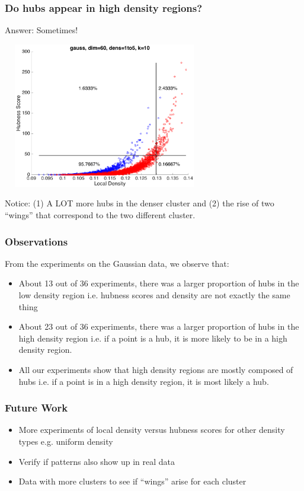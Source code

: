 \documentclass{beamer}
\begin{document}
\begin{frame}
\frametitle{Do hubs appear in high density regions?}

{\small Answer: Sometimes!}

\smallskip

\centering
\includegraphics[width=3.5in,height=2.5in]{./fig/gauss-dim60-1000to5000-k10-DensHub.png}

\smallskip

{\small Notice: (1) A LOT more hubs in the denser cluster and (2) the rise of two ``wings'' that correspond to the two different cluster.}
\end{frame}

\begin{frame}
\frametitle{Observations}

From the experiments on the Gaussian data, we observe that:

\begin{itemize}
\item About 13 out of 36 experiments, there was a larger proportion of hubs in the low density region i.e. hubness scores and density are not exactly the same thing
\item About 23 out of 36 experiments, there was a larger proportion of hubs in the high density region i.e. if a point is a hub, it is more likely to be in a high density region.
\item All our experiments show that high density regions are mostly composed of hubs i.e. if a point is in a high density region, it is most likely a hub.
\end{itemize}

\end{frame}

\begin{frame}
\frametitle{Future Work}

\begin{itemize}
\item More experiments of local density versus hubness scores for other density types e.g. uniform density
\item Verify if patterns also show up in real data
\item Data with more clusters to see if ``wings'' arise for each cluster
\end{itemize}

\end{frame}

\end{document}

